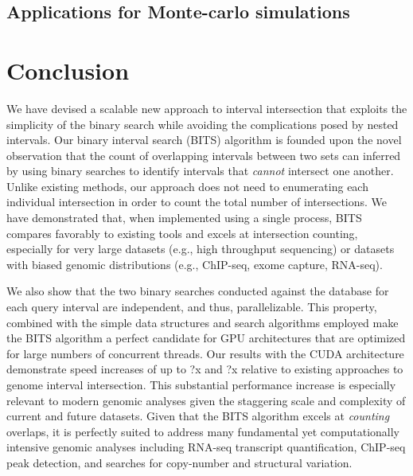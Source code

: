 \documentclass{bioinfo}
\begin{document}
	

	\subsection{Applications for Monte-carlo simulations}
	

	

	\section{Conclusion}
	
	We have devised a scalable new approach to interval intersection
	that exploits the simplicity of the binary search while avoiding the complications
	posed by nested intervals. Our binary interval search (BITS) algorithm is founded upon the novel 
	observation that the count of overlapping intervals between two sets 
	can inferred by using binary searches to identify intervals that \emph{cannot}
	intersect one another. Unlike existing methods, our approach does not need
	to enumerating each individual intersection in order to count the total number 
	of intersections. We have demonstrated that, when implemented using a single process,
	BITS compares favorably to existing tools and excels at intersection counting, especially
	for very large datasets (e.g., high throughput sequencing) or datasets with biased
	genomic distributions (e.g., ChIP-seq, exome capture, RNA-seq).
	
	We also show that the two binary searches conducted
	against the database for each query interval are independent, and thus, parallelizable.
	This property, combined with the simple data structures and search algorithms employed
	make the BITS algorithm a perfect candidate for GPU architectures that are optimized for
	large numbers of concurrent threads. Our results with the CUDA architecture
	demonstrate speed increases of up to ?x and ?x relative to existing 
	approaches to genome interval intersection. This substantial performance increase 
	is especially relevant to modern genomic analyses given the staggering scale and complexity 
	of current and future datasets.  Given that the BITS algorithm excels at \emph{counting}
	overlaps, it is perfectly suited to address many fundamental yet computationally
	intensive genomic analyses including RNA-seq transcript quantification, ChIP-seq
	peak detection, and searches for copy-number and structural variation.
	
\end{document}
